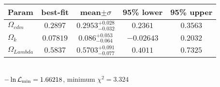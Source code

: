 \begin{tabular}{|l|c|c|c|c|} 
 \hline 
Param & best-fit & mean$\pm\sigma$ & 95\% lower & 95\% upper \\ \hline 
$\Omega{}_{cdm }$ &$0.2897$ & $0.2953_{-0.032}^{+0.028}$ & $0.2361$ & $0.3563$ \\ 
$\Omega{}_{k }$ &$0.07819$ & $0.086_{-0.064}^{+0.053}$ & $-0.02643$ & $0.2032$ \\ 
$\Omega{}_{Lambda }$ &$0.5837$ & $0.5703_{-0.077}^{+0.091}$ & $0.4011$ & $0.7325$ \\ 
\hline 
 \end{tabular} \\ 
$-\ln{\cal L}_\mathrm{min} =1.66218$, minimum $\chi^2=3.324$ \\ 
